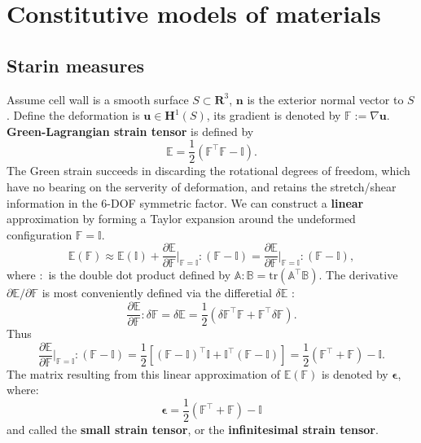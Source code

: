 \documentclass[11pt]{amsart}
\numberwithin{figure}{section}
\theoremstyle{plain}
\theoremstyle{definition}
\numberwithin{equation}{section}
\begin{document}
 
\pagestyle{plain}

\setlength\parskip{1em}

\title{}

\author{}

\date{}


\section{Constitutive models of materials}
\subsection{Starin measures}
Assume cell wall is a smooth surface $S \subset \mathbf{R}^{3} $, $\bm{n}$ is the exterior normal vector to $S$.
Define the deformation is $\bm{u} \in \mathbf{H}^{1} (S)$, 
its gradient is denoted by $ \mathbb{F} := \nabla \bm{u}$.
\textbf{Green-Lagrangian strain tensor} is defined by 
\[
  \mathbb{E} = \frac{1}{ 2 } \left(\mathbb{F}^{\top} \mathbb{F} - \mathbb{I}\right).
\]
The Green strain succeeds in discarding the rotational degrees of freedom,
which have no bearing on the serverity of deformation, 
and retains the stretch/shear information in the 6-DOF symmetric factor.
We can construct a \textbf{linear} approximation by forming a Taylor expansion around the undeformed configuration $\mathbb{F} = \mathbb{I}$.
\[
  \mathbb{E} \left(\mathbb{F}\right) \approx 
  \mathbb{E} \left(\mathbb{I}\right) + 
  \frac{ \partial \mathbb{E} }{ \partial \mathbb{F} } 
  \big\rvert_{\mathbb{F} = \mathbb{I}} : 
  \left(\mathbb{F} - \mathbb{I}\right) 
  = 
  \frac{ \partial \mathbb{E} }{ \partial \mathbb{F} } 
  \big\rvert_{\mathbb{F} = \mathbb{I}} : 
  \left(\mathbb{F} - \mathbb{I}\right),
\] 
where $:$ is the double dot product defined by $\mathbb{A}:\mathbb{B} = \text{tr}(\mathbb{A}^{\top} \mathbb{B})$.
The derivative $\partial \mathbb{E} / \partial \mathbb{F}$ is most conveniently defined via the differetial $\delta \mathbb{E}$ :
\[
  \frac{ \partial \mathbb{E} }{ \partial \mathbb{F} } : 
  \delta \mathbb{F}
  =  \delta \mathbb{E}
  = \frac{1}{ 2 } \left( \delta \mathbb{F}^{\top} \mathbb{F} +
  \mathbb{F}^{\top} \delta \mathbb{F}\right) .
\] 
Thus 
\[
  \frac{ \partial \mathbb{E}}{ \partial \mathbb{F}} 
  \big \rvert_{\mathbb{F} = \mathbb{I} }  : 
  \left(\mathbb{F} - \mathbb{I}\right) = 
  \frac{ 1 }{ 2 } \left[ 
    \left(\mathbb{F} - \mathbb{I}\right)^{\top} \mathbb{I} + 
    \mathbb{I}^{\top} \left(\mathbb{F} - \mathbb{I}\right)
  \right]
  = \frac{ 1 }{ 2 } \left(
    \mathbb{F}^{\top} + \mathbb{F}
  \right) - \mathbb{I}.
\] 
The matrix resulting from this linear approximation of $\mathbb{E}(\mathbb{F})$ is denoted by $\bm{\epsilon}$, where:
\[
  \bm{\epsilon} = \frac{ 1 }{ 2 } \left(\mathbb{F}^{\top} + \mathbb{F}\right) - \mathbb{I}
\] 
and called the \textbf{small strain tensor}, or the 
\textbf{infinitesimal strain tensor}.
\end{document}
